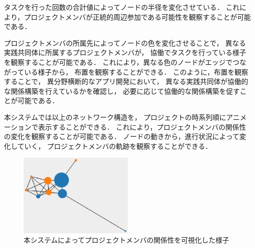 タスクを行った回数の合計値によってノードの半径を変化させている．
これにより，プロジェクトメンバが正統的周辺参加である可能性を観察することが可能である．

プロジェクトメンバの所属先によってノードの色を変化させることで，
異なる実践共同体に所属するプロジェクトメンバが，
協働でタスクを行っている様子を観察することが可能である．
これにより，異なる色のノードがエッジでつながっている様子から，
布置を観察することができる．
このように，布置を観察することで，
異分野横断的なアプリ開発において，
異なる実践共同体が協働的な関係構築を行えているかを確認し，
必要に応じて協働的な関係構築を促すことが可能である．

本システムでは以上のネットワーク構造を，
プロジェクトの時系列順にアニメーションで表示することができる．
これにより，プロジェクトメンバの関係性の変化を観察することが可能である．
ノードの動きから，進行状況によって変化していく，
プロジェクトメンバの軌跡を観察することができる．

\begin{figure}[h]
  \centering
  \includegraphics[width=0.5\textwidth]{img/cop-map-graph.eps}
  \caption{本システムによってプロジェクトメンバの関係性を可視化した様子}
  \label{cop-map-graph}
\end{figure}
